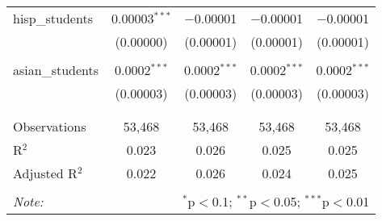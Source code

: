 \begin{table}[!htbp]
\begin{tabular}{@{\extracolsep{-2pt}}lcccc}
 hisp\_students & 0.00003$^{***}$ & $-$0.00001 & $-$0.00001 & $-$0.00001 \\ 
  & (0.00000) & (0.00001) & (0.00001) & (0.00001) \\ 
  & & & & \\ 
 asian\_students & 0.0002$^{***}$ & 0.0002$^{***}$ & 0.0002$^{***}$ & 0.0002$^{***}$ \\ 
  & (0.00003) & (0.00003) & (0.00003) & (0.00003) \\ 
  & & & & \\ 
\hline \\[-1.8ex] 
Observations & 53,468 & 53,468 & 53,468 & 53,468 \\ 
R$^{2}$ & 0.023 & 0.026 & 0.025 & 0.025 \\ 
Adjusted R$^{2}$ & 0.022 & 0.026 & 0.024 & 0.025 \\ 
\hline 
\hline \\[-1.8ex] 
\textit{Note:}  & \multicolumn{4}{r}{$^{*}$p$<$0.1; $^{**}$p$<$0.05; $^{***}$p$<$0.01} \\ 
\end{tabular} 
\end{table} 
